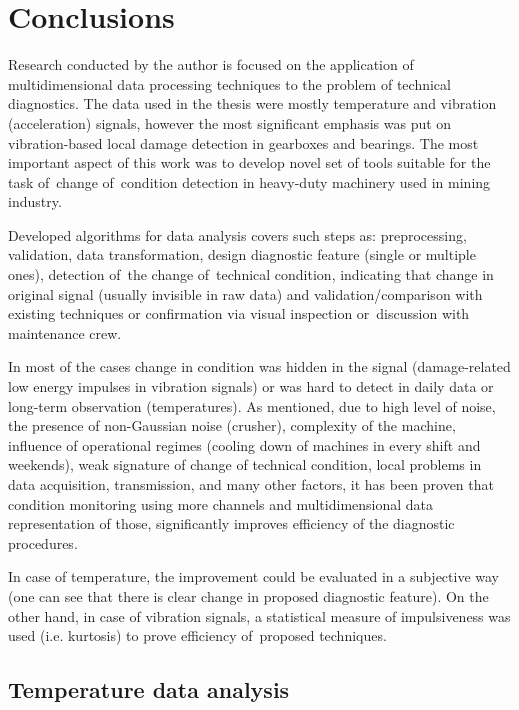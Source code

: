\chapter{Conclusions}


Research conducted by the author is focused on the application of multidimensional data processing techniques to the problem of technical diagnostics. The data used in the thesis were mostly temperature and vibration (acceleration) signals, however the most significant emphasis was put on vibration-based local damage detection in gearboxes and bearings. The most important aspect of this work was to develop novel set of tools suitable for the task of~change of~condition detection in heavy-duty machinery used in mining industry. 

Developed algorithms for data analysis covers such steps as: preprocessing, validation, data transformation, design diagnostic feature (single or multiple ones), detection of~the change of~technical condition, indicating that change in original signal (usually invisible in raw data) and validation/comparison with existing techniques or confirmation via visual inspection or~discussion with maintenance crew.

In most of the cases change in condition was hidden in the signal (damage-related low energy impulses in vibration signals) or was hard to detect in daily data or long-term observation (temperatures). As mentioned, due to high level of noise, the presence of non-Gaussian noise (crusher), complexity of the machine, influence of operational regimes (cooling down of machines in every shift and weekends), weak signature of change of technical condition, local problems in data acquisition, transmission, and many other factors, it has been proven that condition monitoring using more channels and multidimensional data representation of those, significantly improves efficiency of the diagnostic procedures.

In case of temperature, the improvement could be evaluated in a subjective way (one can see that there is clear change in proposed diagnostic feature). On the other hand, in case of vibration signals, a statistical measure of impulsiveness was used (i.e. kurtosis) to prove efficiency of~proposed techniques.

\section{Temperature data analysis}

